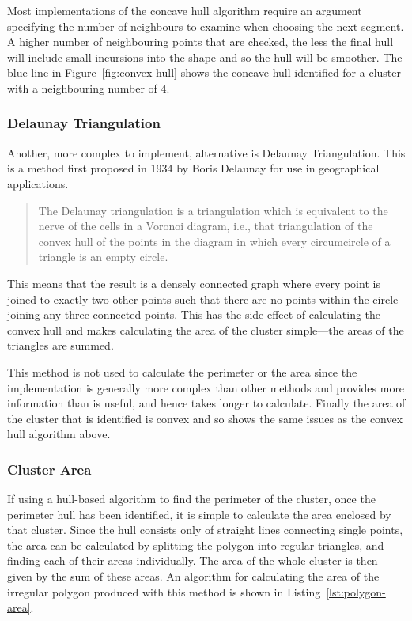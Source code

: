 Most implementations of the concave hull algorithm require an argument
specifying the number of neighbours to examine when choosing the next segment.
A higher number of neighbouring points that are checked, the less the final
hull will include small incursions into the shape and so the hull will be
smoother. The blue line in Figure~\ref{fig:convex-hull} shows the concave hull
identified for a cluster with a neighbouring number of 4.

\subsubsection*{Delaunay Triangulation}
\label{ssub:Delaunay Triangulation}

Another, more complex to implement, alternative is Delaunay
Triangulation\cite{delaunay1934sphere}. This is a method first proposed in 1934
by Boris Delaunay for use in geographical applications.

\begin{quote}
	The Delaunay triangulation is a triangulation which is equivalent to the
	nerve of the cells in a Voronoi diagram, i.e., that triangulation of the
	convex hull of the points in the diagram in which every circumcircle of a
	triangle is an empty circle.\\
	\hspace*{\fill}\cite{okabe2009spatial}
\end{quote}

This means that the result is a densely connected graph where every point is
joined to exactly two other points such that there are no points within the
circle joining any three connected points. This has the side effect of
calculating the convex hull and makes calculating the area of the cluster
simple---the areas of the triangles are summed.

This method is not used to calculate the perimeter or the area since the
implementation is generally more complex than other methods and provides more
information than is useful, and hence takes longer to calculate. Finally the
area of the cluster that is identified is convex and so shows the same issues
as the convex hull algorithm above.

\subsubsection{Cluster Area}
\label{ssub:cluster_area_point}

If using a hull-based algorithm to find the perimeter of the cluster, once the
perimeter hull has been identified, it is simple to calculate the area enclosed
by that cluster. Since the hull consists only of straight lines
connecting single points, the area can be calculated by splitting the polygon
into regular triangles, and finding each of their areas individually. The area
of the whole cluster is then given by the sum of these areas. An algorithm for
calculating the area of the irregular polygon produced with this method is
shown in Listing~\ref{lst:polygon-area}.

